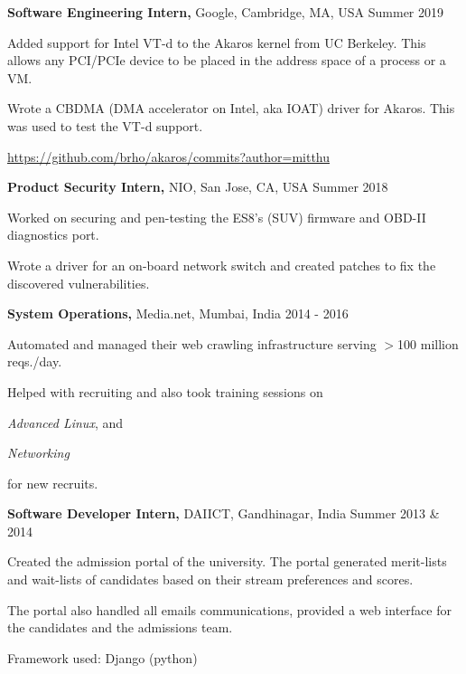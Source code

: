 \documentclass[margin]{res}
\newcommand{\daiict}{\textsc{DAIICT}}
\begin{document}
\begin{resume}
{\bf Software Engineering Intern,} Google, Cambridge, MA, USA
\hfill Summer  2019 %
\begin{itemizeexp}
    \item Added support for Intel VT-d to the Akaros kernel from UC Berkeley.
    This allows any PCI/PCIe device to be placed in the address space of a process or a VM.
    \item Wrote a CBDMA (DMA accelerator on Intel, aka IOAT) driver for Akaros.
    This was used to test the VT-d support.
    \item \url{https://github.com/brho/akaros/commits?author=mitthu}
\end{itemizeexp}

{\bf Product Security Intern,} NIO, San Jose, CA, USA
\hfill Summer 2018 %
\begin{itemizeexp}
    \item Worked on securing and pen-testing the ES8's (SUV) firmware and
    OBD-II diagnostics port.
    \item Wrote a driver for an on-board network switch and created patches
    to fix the discovered vulnerabilities.
\end{itemizeexp}

{\bf System Operations,} Media.net, Mumbai, India
\hfill 2014 - 2016 %
\begin{itemizeexp}
    \item Automated and managed their web crawling infrastructure serving
    $>$100 million reqs./day.
    \item Helped with recruiting and also took training sessions on 
    \begin{enumerate*}[label=(\roman*)]
      \item \textit{Advanced Linux}, and
      \item \textit{Networking}
    \end{enumerate*}
    for new recruits.
\end{itemizeexp}

{\bf Software Developer Intern,} \daiict, Gandhinagar, India
\hfill Summer 2013 \& 2014 %
\begin{itemizeexp}
    \item Created the admission portal of the university. The portal generated
    merit-lists and wait-lists of candidates based on their stream preferences
    and scores. 
    \item The portal also handled all emails communications, provided a
    web interface for the candidates and the admissions team.
    \item Framework used: Django (python)
\end{itemizeexp}


\end{resume}
\end{document}
